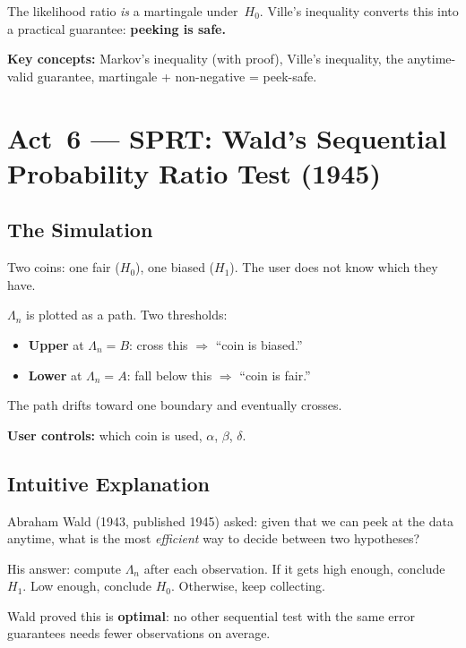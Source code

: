 \documentclass[12pt, a4paper]{article}
\newcommand{\LR}{\Lambda}              %
\begin{document}
The likelihood ratio \emph{is} a martingale under~$H_0$.  Ville's inequality
converts this into a practical guarantee: \textbf{peeking is safe.}

\begin{keytakeaway}
\textbf{Key concepts:} Markov's inequality (with proof), Ville's inequality,
the anytime-valid guarantee, martingale + non-negative = peek-safe.
\end{keytakeaway}


\newpage
\section{Act~6 --- SPRT: Wald's Sequential Probability Ratio Test (1945)}

\subsection{The Simulation}

\begin{simulation}
Two coins: one fair ($H_0$), one biased ($H_1$).  The user does not know
which they have.

$\LR_n$ is plotted as a path.  Two thresholds:
\begin{itemize}[nosep]
  \item \textbf{Upper} at $\LR_n = B$: cross this $\Rightarrow$ ``coin is biased.''
  \item \textbf{Lower} at $\LR_n = A$: fall below this $\Rightarrow$
        ``coin is fair.''
\end{itemize}
The path drifts toward one boundary and eventually crosses.

\textbf{User controls:} which coin is used, $\alpha$, $\beta$, $\delta$.
\end{simulation}

\subsection{Intuitive Explanation}

\begin{intuition}
Abraham Wald (1943, published 1945) asked: given that we can peek at the data
anytime, what is the most \emph{efficient} way to decide between two
hypotheses?

His answer: compute $\LR_n$ after each observation.  If it gets high enough,
conclude $H_1$.  Low enough, conclude $H_0$.  Otherwise, keep collecting.

Wald proved this is \textbf{optimal}: no other sequential test with the same
error guarantees needs fewer observations on average.
\end{intuition}
\end{document}

